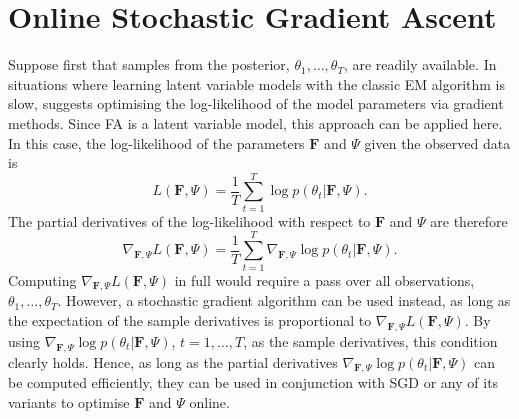 \documentclass[msc,deptreport.inf]{infthesis} %
\newcommand{\matr}[1]{\mathbf{#1}}
\begin{document}
\section{Online Stochastic Gradient Ascent}\label{sec:gradient_fa}

Suppose first that samples from the posterior, $\theta_1,\dots,\theta_T$, are readily available. In situations where learning latent variable models with the classic EM algorithm is slow, \cite{barber2007} suggests optimising the log-likelihood of the model parameters via gradient methods. Since FA is a latent variable model, this approach can be applied here. In this case, the log-likelihood of the parameters $\matr{F}$ and $\Psi$ given the observed data is 
\begin{equation}
	L(\matr{F}, \Psi) = \frac{1}{T} \sum_{t=1}^T \log p(\theta_t | \matr{F}, \Psi).
\end{equation}
The partial derivatives of the log-likelihood with respect to $\matr{F}$ and $\Psi$ are therefore
\begin{equation}
	\nabla_{\matr{F}, \Psi} L(\matr{F}, \Psi) = \frac{1}{T} \sum_{t=1}^T \nabla_{\matr{F}, \Psi} \log p(\theta_t | \matr{F}, \Psi).
\end{equation}
Computing $\nabla_{\matr{F}, \Psi} L(\matr{F}, \Psi)$ in full would require a pass over all observations, $\theta_1, \dots, \theta_T$. However, a stochastic gradient algorithm can be used instead, as long as the expectation of the sample derivatives is proportional to $\nabla_{\matr{F}, \Psi} L(\matr{F}, \Psi)$. By using $\nabla_{\matr{F}, \Psi} \log p(\theta_t | \matr{F}, \Psi)$, $t=1,\dots,T$, as the sample derivatives, this condition clearly holds. Hence, as long as the partial derivatives $\nabla_{\matr{F}, \Psi} \log p(\theta_t | \matr{F}, \Psi)$ can be computed efficiently, they can be used in conjunction with SGD or any of its variants to optimise $\matr{F}$ and $\Psi$ online. 
\end{document}
